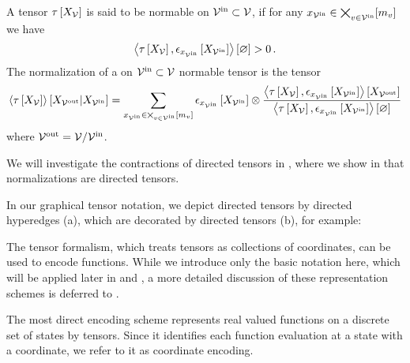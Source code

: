 \begin{definition}\label{def:normalization}
	A tensor $\tau\left[X_{\mathcal{V}}\right]$ is said to be normable on $\mathcal{V}^{\mathrm{in}}\subset\mathcal{V}$, if for any $x_{\mathcal{V}^{\mathrm{in}}}\in\bigtimes_{v\in\mathcal{V}^{\mathrm{in}}}[m_{v}]$ we have
	\begin{align*}
		 \left\langle \tau\left[X_{\mathcal{V}}\right],\epsilon_{x_{\mathcal{V}^{\mathrm{in}}}}\left[X_{\mathcal{V}^{\mathrm{in}}}\right]\right\rangle \left[ \varnothing \right] > 0 \, .
	\end{align*}
	The normalization of a on $\mathcal{V}^{\mathrm{in}}\subset\mathcal{V}$ normable tensor is the tensor
	\begin{align*}
		\left\langle \tau\left[X_{\mathcal{V}}\right]\right\rangle \left[ X_{\mathcal{V}^{\mathrm{out}}} | X_{\mathcal{V}^{\mathrm{in}}} \right] =
		\sum_{x_{\mathcal{V}^{\mathrm{in}}}\in\bigtimes_{v\in\mathcal{V}^{\mathrm{in}}}[m_{v}]}
		\epsilon_{x_{\mathcal{V}^{\mathrm{in}}}}\left[X_{\mathcal{V}^{\mathrm{in}}}\right] \otimes \frac{
		\left\langle \tau\left[X_{\mathcal{V}}\right],\epsilon_{x_{\mathcal{V}^{\mathrm{in}}}}\left[X_{\mathcal{V}^{\mathrm{in}}}\right]\right\rangle \left[ X_{\mathcal{V}^{\mathrm{out}}} \right]
		}{
		\left\langle \tau\left[X_{\mathcal{V}}\right],\epsilon_{x_{\mathcal{V}^{\mathrm{in}}}}\left[X_{\mathcal{V}^{\mathrm{in}}}\right]\right\rangle \left[ \varnothing \right]
		}
	\end{align*}
	where $\mathcal{V}^{\mathrm{out}} = \mathcal{V}/\mathcal{V}^{\mathrm{in}}$.
\end{definition}

We will investigate the contractions of directed tensors in , where we show in  that normalizations are directed tensors.

In our graphical tensor notation, we depict directed tensors by directed hyperedges (a), which are decorated by directed tensors (b), for example:
	\begin{center}
		
	\end{center}



\sect{\bnencoding}

The tensor formalism, which treats tensors as collections of coordinates, can be used to encode functions.
While we introduce only the basic notation here, which will be applied later in  and , a more detailed discussion of these representation schemes is deferred to .


The most direct encoding scheme represents real valued functions on a discrete set of states by tensors.
Since it identifies each function evaluation at a state with a coordinate, we refer to it as coordinate encoding.

